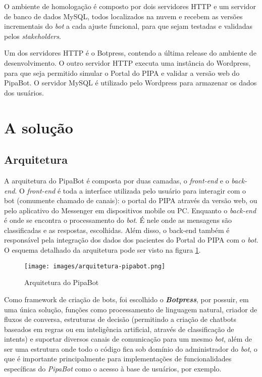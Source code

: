  O ambiente de homologação é composto por dois servidores HTTP e um servidor de banco de dados MySQL, todos localizados na nuvem e recebem as versões incrementais do \textit{bot} a cada ajuste funcional, para que sejam testadas e validadas pelos \textit{stakeholders}.
  
  Um dos servidores HTTP é o Botpress, contendo a última release do ambiente de desenvolvimento. O outro servidor HTTP executa uma instância do Wordpress, para que seja permitido simular o Portal do PIPA e validar a versão web do PipaBot. O servidor MySQL é utilizado pelo Wordpress para armazenar os dados dos usuários.
  
  \section{A solução}
  
  \subsection{Arquitetura}
  A arquitetura do PipaBot é composta por duas camadas, o \textit{front-end} e o \textit{back-end}. O \textit{front-end} é toda a interface utilizada pelo usuário para interagir com o bot (comumente chamado de canais): o portal do PIPA através da versão web, ou pelo aplicativo do Messenger em dispositivos mobile ou PC. Enquanto o \textit{back-end} é onde se encontra o processamento do \textit{bot}. É nele onde as mensagens são classificadas e as respostas, escolhidas. Além disso, o back-end também é responsável pela integração dos dados dos pacientes do Portal do PIPA com o \textit{bot}. O esquema detalhado da arquitetura pode ser visto na figura \ref{fig:arquitetura}.
  
	  \begin{figure}[h!]
	  	\begin{center}
		  	\texttt{[image: images/arquitetura-pipabot.png]}
			\caption{Arquitetura do PipaBot}
			\label{fig:arquitetura}
	  	\end{center}
	  \end{figure}
  
  Como framework de criação de bots, foi escolhido o \textbf{\textit{Botpress}}, por possuir, em uma única solução, funções como processamento de linguagem natural, criador de fluxos de conversa, estruturas de decisão (permitindo a criação de chatbots baseados em regras ou em inteligência artificial, através de classificação de intents) e suportar diversos canais de comunicação para um mesmo \textit{bot}, além de ser uma estrutura onde todo o código fica sob domínio do administrador do \textit{bot}, o que é importante principalmente para implementações de funcionalidades específicas do \textit{PipaBot} como o acesso à base de usuários, por exemplo.
  
